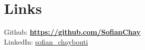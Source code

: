 \documentclass[]{deedy-resume-openfont}
\begin{document}
\begin{minipage}[t]{0.33\textwidth}
\sectionsep





\section{Links} 

Github: \href{https://github.com/SofianChay}{\bf https://github.com/SofianChay} \\
LinkedIn: \href{https://www.linkedin.com/in/sofian-chaybouti-82b262173/}{\underline{sofian\_chaybouti}} \\





%
%

\end{minipage} 
\hfill
\end{document}
